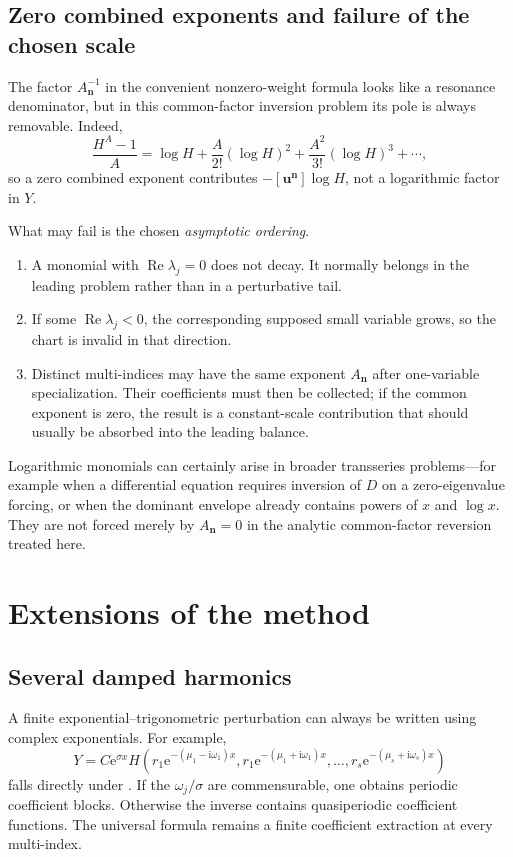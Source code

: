 \documentclass[11pt,oneside]{article}
\theoremstyle{plain}
\theoremstyle{definition}
\theoremstyle{remark}
\newcommand{\e}{\mathrm{e}}
\newcommand{\ii}{\mathrm{i}}
\newcommand{\Real}{\operatorname{Re}}
\begin{document}
\subsection{Zero combined exponents and failure of the chosen scale}

The factor \(A_{\bm n}^{-1}\) in the convenient nonzero-weight formula looks
like a resonance denominator, but in this common-factor inversion problem its
pole is always removable.  Indeed,
\begin{equation}
 \frac{H^A-1}{A}
 =\log H+\frac{A}{2!}(\log H)^2
 +\frac{A^2}{3!}(\log H)^3+\cdots,
 \label{eq:removable-A-zero}
\end{equation}
so a zero combined exponent contributes
\(-[\bm u^{\bm n}]\log H\), not a logarithmic factor in \(Y\).

What may fail is the chosen \emph{asymptotic ordering}.
\begin{enumerate}
\item A monomial with \(\Real\lambda_j=0\) does not decay.  It normally
belongs in the leading problem rather than in a perturbative tail.
\item If some \(\Real\lambda_j<0\), the corresponding supposed small variable
grows, so the chart is invalid in that direction.
\item Distinct multi-indices may have the same exponent \(A_{\bm n}\) after
one-variable specialization.  Their coefficients must then be collected; if
the common exponent is zero, the result is a constant-scale contribution that
should usually be absorbed into the leading balance.
\end{enumerate}
Logarithmic monomials can certainly arise in broader transseries problems---for
example when a differential equation requires inversion of \(D\) on a
zero-eigenvalue forcing, or when the dominant envelope already contains
powers of \(x\) and \(\log x\).  They are not forced merely by
\(A_{\bm n}=0\) in the analytic common-factor reversion treated here.

\section{Extensions of the method}
\label{sec:extensions}

\subsection{Several damped harmonics}

A finite exponential--trigonometric perturbation can always be written using
complex exponentials.  For example,
\begin{equation}
 Y=C\e^{\sigma x}
 H\!\left(
 r_1\e^{-(\mu_1-\ii\omega_1)x},
 r_1\e^{-(\mu_1+\ii\omega_1)x},\ldots,
 r_s\e^{-(\mu_s+\ii\omega_s)x}
 \right)
 \label{eq:multi-frequency-map}
\end{equation}
falls directly under .  If the
\(\omega_j/\sigma\) are commensurable, one obtains periodic coefficient
blocks.  Otherwise the inverse contains quasiperiodic coefficient functions.
The universal formula remains a finite coefficient extraction at every
multi-index.
\end{document}
